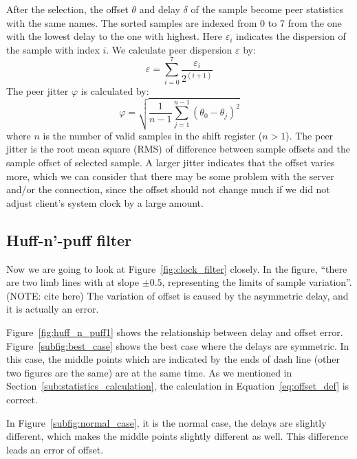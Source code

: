 After the selection, the offset $\theta$ and delay $\delta$ of the sample
become peer statistics with the same names. The sorted samples are indexed from
0 to 7 from the one with the lowest delay to the one with highest. Here
$\varepsilon_i$ indicates the dispersion of the sample with index $i$. We
calculate peer dispersion $\varepsilon$ by:
\begin{equation}
    \varepsilon = \sum^{7}_{i=0} \frac{\varepsilon_i}{2^{(i+1)}}
    \label{eq:peer_dispersion}
\end{equation}
The peer jitter $\varphi$ is calculated by:
\begin{equation}
    \varphi = \sqrt{\frac{1}{n-1} \sum^{n-1}_{j=1} (\theta_0 - \theta_j)^2}
    \label{eq:peer_jitter}
\end{equation}
where $n$ is the number of valid samples in the shift register ($n > 1$).
The peer jitter is the root mean square (RMS) of difference between sample
offsets and the sample offset of selected sample. A larger jitter indicates
that the offset varies more, which we can consider that there may be some
problem with the server and/or the connection, since the offset should not
change much if we did not adjust client's system clock by a large amount.

\subsection{Huff-n'-puff filter}%
\label{sub:huff_n_puff_filter}
Now we are going to look at Figure~\ref{fig:clock_filter} closely. In the
figure, ``there are two limb lines with at slope $\pm0.5$, representing the
limits of sample variation''. (NOTE: cite here) 
The variation of offset is caused by the asymmetric delay, and it is actually
an error.

Figure~\ref{fig:huff_n_puff1} shows the relationship between delay and offset
error.  Figure~\ref{subfig:best_case} shows the best case where the delays are
symmetric. In this case, the middle points which are indicated by the ends of
dash line (other two figures are the same) are at the same time. As we
mentioned in Section~\ref{sub:statistics_calculation}, the calculation in
Equation~\ref{eq:offset_def} is correct. 



In Figure~\ref{subfig:normal_case}, it is the normal case, the delays are
slightly different, which makes the middle points slightly different as well.
This difference leads an error of offset.

